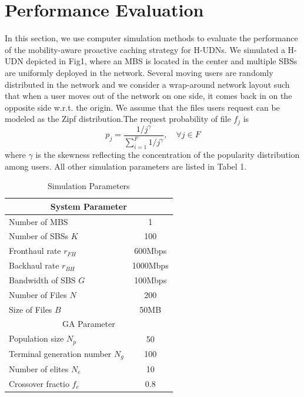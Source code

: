 \documentclass[conference]{IEEEtran}
\begin{document}
\section{Performance Evaluation}
In this section, we use computer simulation methods to evaluate the performance of the mobility-aware proactive caching strategy for H-UDNs. We simulated a H-UDN depicted in Fig1, where an MBS is located in the center and multiple SBSs are uniformly deployed in the network. Several moving users are randomly distributed in the network and we consider a wrap-around network layout such that when a user moves out of the network on one side, it comes back in on the opposite side w.r.t. the origin. We assume that the files users request can be modeled as the Zipf distribution\cite{6736753}.The request probability of file $f_j$ is
$$p_j=\frac{1/j^\gamma}{\sum_{i=1}^F 1/j^\gamma}, \quad \forall j\in F$$
where $\gamma$ is the skewness reflecting the concentration of the popularity distribution among users. All other simulation parameters are listed in Tabel 1.

\begin{table}[htbp]
 \caption{Simulation Parameters}
 \setlength{\tabcolsep}{7mm}
 \begin{center}
  \begin{tabular}{|l|c|}
   \hline
   \multicolumn{2}{|c|}{System Parameter}                \\\hline
   Number of MBS                  & 1                 \\ \hline
   Number of SBSs $K$             & 100                \\\hline
   Fronthaul rate $r_{FH}$        & 600Mbps               \\ \hline
   Backhaul rate $r_{BH}$         & 1000Mbps               \\\hline
   Bandwidth of SBS $G$           &  100Mbps              \\\hline
   Number of Files $N$            & 200               \\\hline
   Size of Files $B$              & 50MB            \\\hline
   \multicolumn{2}{|c|}{GA Parameter}                \\\hline
   Population size $N_p$          & 50              \\\hline
   Terminal generation number $N_g$ & 100               \\\hline
   Number of elites $N_e$         & 10              \\\hline
   Crossover fractio $f_c$        & 0.8            \\\hline
  \end{tabular}
  \label{tab1}
 \end{center}
\end{table}
\end{document}
